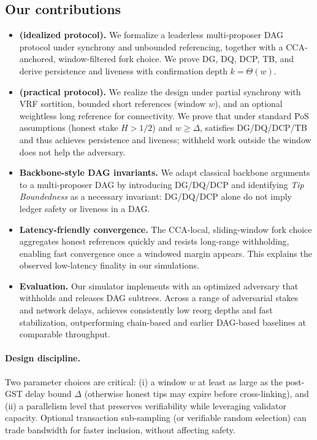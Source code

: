 \subsection{Our contributions}
\begin{itemize}
	\item \textbf{\ProjIdeal (idealized protocol).} We formalize a leaderless multi-proposer DAG protocol under synchrony and unbounded referencing, together with a CCA-anchored, window-filtered fork choice. We prove DG, DQ, DCP, TB, and derive persistence and liveness with confirmation depth $k = \Theta(w)$.
	\item \textbf{\ProjBase (practical protocol).} We realize the design under partial synchrony with VRF sortition, bounded short references (window $w$), and an optional weightless long reference for connectivity. We prove that under standard PoS assumptions (honest stake $H>1/2$) and $w \ge \Delta$, \ProjBase satisfies DG/DQ/DCP/TB and thus achieves persistence and liveness; withheld work outside the window does not help the adversary.
	\item \textbf{Backbone-style DAG invariants.} We adapt classical backbone arguments to a multi-proposer DAG by introducing DG/DQ/DCP and identifying \emph{Tip Boundedness} as a necessary invariant: DG/DQ/DCP alone do not imply ledger safety or liveness in a DAG.
	\item \textbf{Latency-friendly convergence.} The CCA-local, sliding-window fork choice aggregates honest references quickly and resists long-range withholding, enabling fast convergence once a windowed margin appears. This explains the observed low-latency finality in our simulations.
	\item \textbf{Evaluation.} Our simulator implements \ProjBase with an optimized adversary that withholds and releases DAG subtrees. Across a range of adversarial stakes and network delays, \Proj achieves consistently low reorg depths and fast stabilization, outperforming chain-based and earlier DAG-based baselines at comparable throughput.
\end{itemize}

\paragraph{Design discipline.} 
Two parameter choices are critical: (i) a window $w$ at least as large as the post-GST delay bound $\Delta$ (otherwise honest tips may expire before cross-linking), and (ii) a parallelism level that preserves verifiability while leveraging validator capacity. Optional transaction sub-sampling (or verifiable random selection) can trade bandwidth for faster inclusion, without affecting safety.

